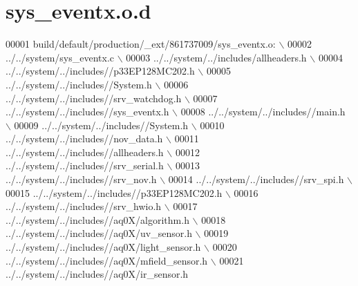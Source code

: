 \hypertarget{a00069_source}{\section{sys\+\_\+eventx.\+o.\+d}
\label{a00069_source}
}

\begin{DoxyCode}
00001 build/\textcolor{keywordflow}{default}/production/\_ext/861737009/sys\_eventx.o:  \(\backslash\)
00002  ../../system/sys\_eventx.c  \(\backslash\)
00003 ../../system/../includes/allheaders.h  \(\backslash\)
00004 ../../system/../includes\textcolor{comment}{//p33EP128MC202.h  \(\backslash\)}
00005 \textcolor{comment}{../../system/../includes//System.h  \(\backslash\)}
00006 \textcolor{comment}{../../system/../includes//srv\_watchdog.h  \(\backslash\)}
00007 \textcolor{comment}{../../system/../includes//sys\_eventx.h  \(\backslash\)}
00008 \textcolor{comment}{../../system/../includes//main.h  \(\backslash\)}
00009 \textcolor{comment}{../../system/../includes//System.h  \(\backslash\)}
00010 \textcolor{comment}{../../system/../includes//nov\_data.h  \(\backslash\)}
00011 \textcolor{comment}{../../system/../includes//allheaders.h  \(\backslash\)}
00012 \textcolor{comment}{../../system/../includes//srv\_serial.h  \(\backslash\)}
00013 \textcolor{comment}{../../system/../includes//srv\_nov.h  \(\backslash\)}
00014 \textcolor{comment}{../../system/../includes//srv\_spi.h  \(\backslash\)}
00015 \textcolor{comment}{../../system/../includes//p33EP128MC202.h  \(\backslash\)}
00016 \textcolor{comment}{../../system/../includes//srv\_hwio.h  \(\backslash\)}
00017 \textcolor{comment}{../../system/../includes//aq0X/algorithm.h  \(\backslash\)}
00018 \textcolor{comment}{../../system/../includes//aq0X/uv\_sensor.h  \(\backslash\)}
00019 \textcolor{comment}{../../system/../includes//aq0X/light\_sensor.h  \(\backslash\)}
00020 \textcolor{comment}{../../system/../includes//aq0X/mfield\_sensor.h  \(\backslash\)}
00021 \textcolor{comment}{../../system/../includes//aq0X/ir\_sensor.h }
\end{DoxyCode}
